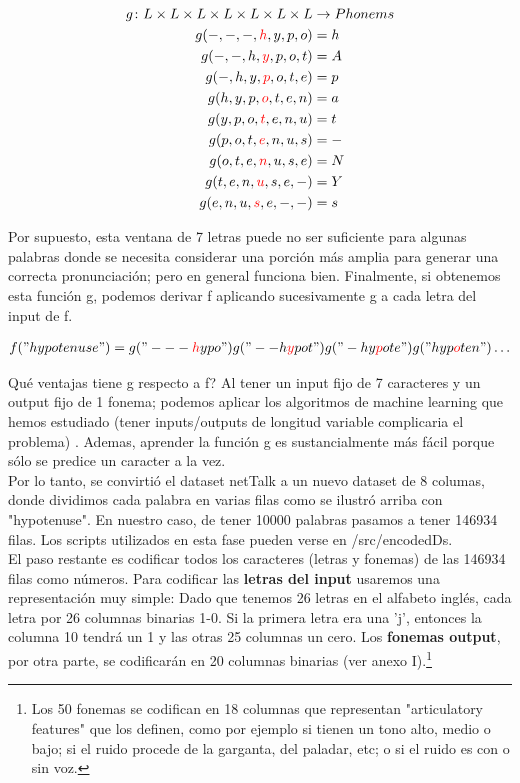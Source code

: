 \documentclass[paper=a4, fontsize=11pt]{scrartcl} %
\numberwithin{equation}{section} %
\numberwithin{figure}{section} %
\numberwithin{table}{section} %
\begin{document}
\begin{align*}
  g \colon L \times L \times L \times L \times L \times L \times L  & \to Phonems \\
  g(-,-,-,\textcolor{red}{h},y,p,o) &= h \\  
  g(-,-,h,\textcolor{red}{y},p,o,t) &= A \\
  g(-,h,y,\textcolor{red}{p},o,t,e) &= p \\
  g(h,y,p,\textcolor{red}{o},t,e,n) &= a \\
  g(y,p,o,\textcolor{red}{t},e,n,u) &= t \\
  g(p,o,t,\textcolor{red}{e},n,u,s)& = - \\
  g(o,t,e,\textcolor{red}{n},u,s,e)& = N \\
  g(t,e,n,\textcolor{red}{u},s,e,-)& = Y \\
  g(e,n,u,\textcolor{red}{s},e,-,-) &= s
\end{align*}

Por supuesto, esta ventana de 7 letras puede no ser suficiente para algunas palabras donde se necesita considerar una porción más amplia para generar una correcta pronunciación; pero en general funciona bien. Finalmente, si obtenemos esta función g, podemos derivar f aplicando sucesivamente g a cada letra del input de f. 

\begin{align*}
  f("hypotenuse") = g("---\textcolor{red}{h}ypo")  g("--h\textcolor{red}{y}pot") g("-hy\textcolor{red}{p}ote") g("hyp\textcolor{red}{o}ten")  \ldots
\end{align*}


Qué ventajas tiene g respecto a f? Al tener un input fijo de 7 caracteres y un output fijo de 1 fonema; podemos aplicar los algoritmos de machine learning que hemos estudiado (tener inputs/outputs de longitud variable complicaria el problema) . Ademas, aprender la función g es sustancialmente más fácil porque sólo se predice un caracter a la vez. \\

Por lo tanto, se convirtió el dataset netTalk a un nuevo dataset de 8 columas, donde dividimos cada palabra en varias filas como se ilustró arriba con "hypotenuse". En nuestro caso, de tener 10000 palabras pasamos a tener 146934 filas. Los scripts utilizados en esta fase pueden verse en /src/encodedDs. \\

El paso restante es codificar todos los caracteres (letras y fonemas) de las 146934 filas como números. Para codificar las \textbf{letras del input} usaremos una representación muy simple: Dado que tenemos 26 letras en el alfabeto inglés, cada letra por 26 columnas binarias 1-0. Si la primera letra era una 'j', entonces la columna 10 tendrá un 1 y las otras 25 columnas un cero. Los \textbf{fonemas output}, por otra parte, se codificarán en 20 columnas binarias (ver anexo I).\footnote{Los 50 fonemas se codifican en 18 columnas que representan "articulatory features" que los definen, como por ejemplo si tienen un tono alto, medio o bajo; si el ruido procede de la garganta, del paladar, etc; o si el ruido es con o sin voz.} \\
\end{document}
